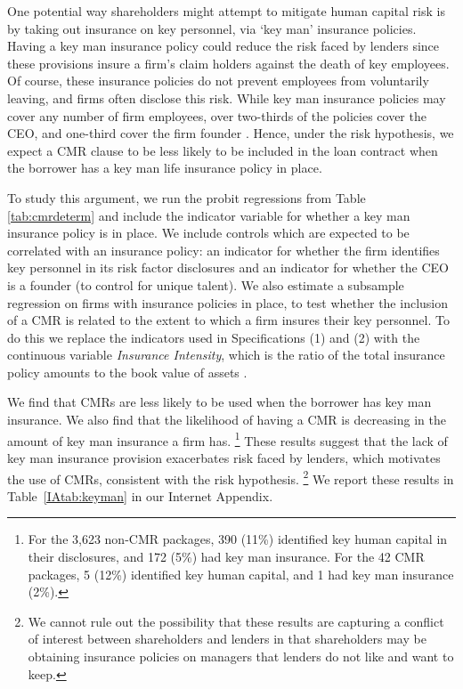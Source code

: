 \documentclass[a4paper,12pt]{article}
\begin{document}
One potential way shareholders might attempt to mitigate human capital risk is by taking out insurance on key personnel, via `key man' insurance policies.
Having a key man insurance policy could reduce the risk faced by lenders since these provisions insure a firm's claim holders against the death of key employees.  
Of course, these insurance policies do not prevent employees from voluntarily leaving, and firms often disclose this risk.
While key man insurance policies may cover any number of firm employees, over two-thirds of the policies cover the CEO, and one-third cover the firm founder \citep{Israelsen_2017}.
Hence, under the risk hypothesis, we expect a CMR clause to be less likely to be included in the loan contract when the borrower has a key man life insurance policy in place.


To study this argument, we run the probit regressions from Table \ref{tab:cmrdeterm} and include the indicator variable for whether a key man insurance policy is in place.
We include controls which are expected to be correlated with an insurance policy: an indicator for whether the firm identifies key personnel in its risk factor disclosures \citep{Israelsen_2017} and an indicator for whether the CEO is a founder (to control for unique talent).
We also estimate a subsample regression on firms with insurance policies in place, to test whether the inclusion of a CMR is related to the extent to which a firm insures their key personnel.
To do this we replace the indicators used in Specifications (1) and (2) with the continuous variable \textit{Insurance Intensity}, which is the ratio of the total insurance policy amounts to the book value of assets \citep[collected by][]{Israelsen_2017}.


We find that CMRs are less likely to be used when the borrower has key man insurance.
We also find that the likelihood of having a CMR is decreasing in the amount of key man insurance a firm has.%
    \footnote{For the 3,623 non-CMR packages, 390 (11\%) identified key human capital in their disclosures, and 172 (5\%) had key man insurance. For the 42 CMR packages, 5 (12\%) identified key human capital, and 1 had key man insurance (2\%).}
These results suggest that the lack of key man insurance provision exacerbates risk faced by lenders, which motivates the use of CMRs, consistent with the risk hypothesis.%
 \footnote{We cannot rule out the possibility that these results are capturing a conflict of interest between shareholders and lenders in that shareholders may be obtaining insurance policies on managers that lenders do not like and want to keep.}
We report these results in Table~\ref{IAtab:keyman} in our Internet Appendix. 
\end{document}
